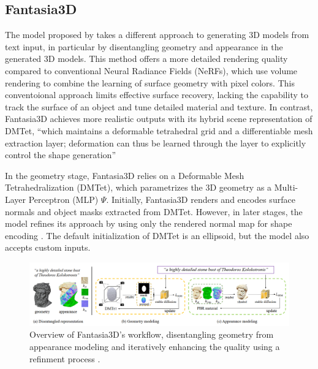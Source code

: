 \subsection{Fantasia3D}\label{fantasia3D}

The model proposed by \citeauthor{chen2023fantasia3d} takes a different approach to generating 3D models from text input, in particular by disentangling geometry and appearance in the generated 3D models.
This method offers a more detailed rendering quality compared to conventional Neural Radiance Fields (NeRFs), which use volume rendering to combine the learning of surface geometry with pixel colors. This conventoional approach limits effective surface recovery, lacking the capability to track the surface of an object and tune detailed material and texture. In contrast, Fantasia3D achieves more realistic outputs with its hybrid scene representation of DMTet, ``which maintains a deformable tetrahedral grid and a differentiable mesh extraction layer; deformation can thus be learned through the layer to explicitly control the shape generation'' \citep{chen2023fantasia3d}

In the geometry stage, Fantasia3D relies on a Deformable Mesh Tetrahedralization (DMTet), which parametrizes the 3D geometry as a Multi-Layer Perceptron (MLP) \(\Psi\). Initially, Fantasia3D renders and encodes surface normals and object masks extracted from DMTet. However, in later stages, the model refines its approach by using only the rendered normal map for shape encoding \citep{chen2023fantasia3d}. The default initialization of DMTet is an ellipsoid, but the model also accepts custom inputs.

\begin{figure}[ht]
  \centering
    \includegraphics[width=1\columnwidth]{figures/Fantasia3D.png}
    \caption{Overview of Fantasia3D's workflow, disentangling geometry from appearance modeling and iteratively enhancing the quality using a refinment process \citep{chen2023fantasia3d}.}\label{fig:figureFantasia}
\end{figure}

